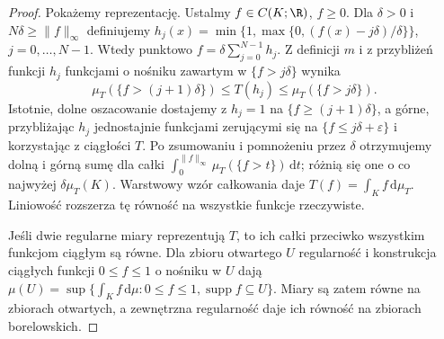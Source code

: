 \begin{proof}
Pokażemy reprezentację. Ustalmy $f\in C(K;\R)$, $f\ge0$.
Dla $\delta>0$ i $N\delta\ge\|f\|_\infty$ definiujemy
$h_j(x)=\min\{1,\max\{0,(f(x)-j\delta)/\delta\}\}$,
$j=0,\dots,N-1$. Wtedy punktowo
$f=\delta\sum_{j=0}^{N-1}h_j$. Z definicji $m$
i z przybliżeń funkcji $h_j$ funkcjami o nośniku
zawartym w $\{f>j\delta\}$ wynika
\[
 \mu_T(\{f>(j+1)\delta\})\le T(h_j)
 \le\mu_T(\{f>j\delta\}).
\]
Istotnie, dolne oszacowanie dostajemy z $h_j=1$
na $\{f\ge(j+1)\delta\}$, a górne, przybliżając $h_j$
jednostajnie funkcjami zerującymi się na
$\{f\le j\delta+\varepsilon\}$ i korzystając z
ciągłości $T$. Po zsumowaniu i pomnożeniu przez $\delta$
otrzymujemy dolną i górną sumę dla całki
$\int_0^{\|f\|_\infty}\mu_T(\{f>t\})\,\mathrm dt$;
różnią się one o co najwyżej $\delta\mu_T(K)$.
Warstwowy wzór całkowania daje
$T(f)=\int_Kf\,\mathrm d\mu_T$. Liniowość rozszerza
tę równość na wszystkie funkcje rzeczywiste.

Jeśli dwie regularne miary reprezentują $T$, to ich całki
przeciwko wszystkim funkcjom ciągłym są równe.
Dla zbioru otwartego $U$ regularność i konstrukcja ciągłych
funkcji $0\le f\le1$ o nośniku w $U$ dają
$\mu(U)=\sup\{\int_Kf\,\mathrm d\mu:0\le f\le1,
\operatorname{supp}f\subseteq U\}$.
Miary są zatem równe na zbiorach otwartych,
a zewnętrzna regularność daje ich równość na zbiorach borelowskich.
\end{proof}

